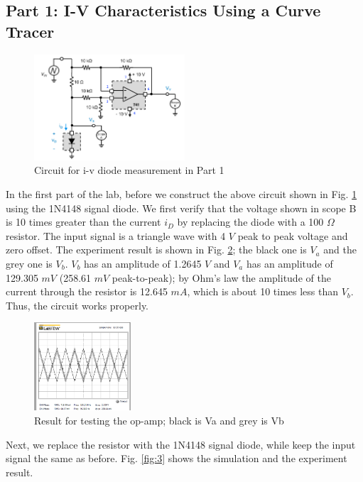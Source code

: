 \documentclass[letterpaper, 10 pt, conference]{ieeeconf}  %
\begin{document}
\subsection{Part 1: I-V Characteristics Using a Curve Tracer}
\begin{figure}[h]
  \centering
  \includegraphics[width=0.5\textwidth]{images/Part1circuit.png}
  \caption{Circuit for i-v diode measurement in Part 1}
  \label{fig:1}
\end{figure}
\par In the first part of the lab, before we construct the above circuit shown in Fig. \ref{fig:1} using the 1N4148 signal diode. We first verify that the voltage shown in scope B is 10 times greater than the current $i_{D}$ by replacing the diode with a 100 $\Omega$ resistor. The input signal is a triangle wave with 4 $V$ peak to peak voltage and zero offset. The experiment result is shown in Fig. \ref{fig:2}; the black one is $V_{a}$ and the grey one is $V_{b}$. $V_{b}$ has an amplitude of 1.2645 $V$ and $V_{a}$ has an amplitude of 129.305 $mV$ (258.61 $mV$ peak-to-peak); by Ohm's law the amplitude of the current through the resistor is 12.645  $mA$, which is about 10 times less than $V_{b}$. Thus, the circuit works properly.
\begin{figure}[h]
  \centering
  \includegraphics[width=0.32\textwidth]{images/result1.png}
  \caption{Result for testing the op-amp; black is Va and grey is Vb}
  \label{fig:2}
\end{figure}
\par Next, we replace the resistor with the 1N4148 signal diode, while keep the input signal the same as before. Fig. \ref{fig:3} shows the simulation and the experiment result.
\end{document}
